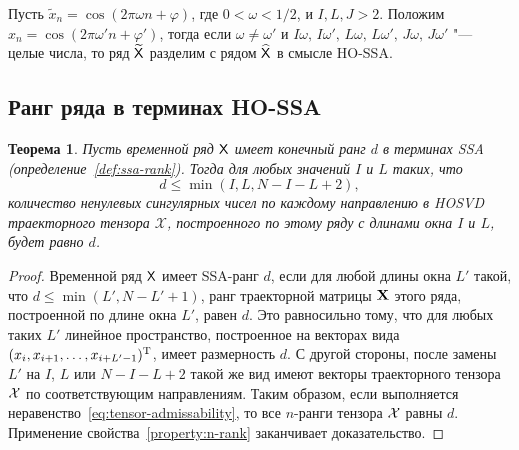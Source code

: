 \documentclass[specialist,
    substylefile=spbu.rtx,
    subf,href,colorlinks=true, 12pt]{disser}
\theoremstyle{plain}
\newtheorem{theorem}{Теорема}
\theoremstyle{definition}
\theoremstyle{remark}
\newtheorem*{remark}{Замечание}
\begin{document}
\begin{itemize}
        Пусть $\tilde{x}_n=\cos(2\pi \omega n + \varphi)$, где $0 < \omega < 1/2$, и $I, L, J > 2$.
        Положим \linebreak $\hat{x}_n=\cos(2\pi \omega' n + \varphi')$,
        тогда если $\omega\ne\omega'$ и $I\omega,\, I\omega',\, L\omega,\, L\omega',\, J\omega,\, J\omega'$
        "--- целые числа, то ряд $\widetilde{\mathsf{X}}$ разделим с рядом $\widehat{\mathsf{X}}$ в смысле HO-SSA.
    \end{itemize}


    \subsection{Ранг ряда в терминах HO-SSA}\label{subsec:tensor-ssa-rank}
    \begin{theorem}
        \label{state:tens-ssa-rank}
        Пусть временной ряд $\mathsf{X}$ имеет конечный ранг $d$ в терминах \emph{SSA} (определение~\ref{def:ssa-rank}).
        Тогда для любых значений $I$ и $L$ таких, что
        \begin{equation}
            d\leqslant\min(I, L, N-I-L+2), \label{eq:tensor-admissability}
        \end{equation}
        количество ненулевых сингулярных чисел по каждому направлению в \emph{HOSVD} траекторного тензора $\mathcal{X}$,
        построенного по этому ряду с длинами окна $I$ и $L$, будет равно $d$.
    \end{theorem}
    \begin{proof}
        Временной ряд $\mathsf{X}$ имеет SSA-ранг $d$, если для любой длины окна $L'$ такой, что
        $d \leqslant \min(L', N-L'+1)$,
        ранг траекторной матрицы $\mathbf{X}$ этого ряда, построенной по длине окна $L'$, равен $d$.
        Это равносильно тому, что для любых таких $L'$ линейное пространство, построенное на векторах вида
        $(x_i, x_{i+1}, \ldots, x_{i + L' - 1})^{\mathrm{T}}$, имеет размерность $d$.
        С другой стороны, после замены $L'$ на $I$, $L$ или $N-I-L+2$ такой же вид имеют векторы траекторного тензора $\mathcal{X}$ по соответствующим направлениям.
        Таким образом, если выполняется неравенство~\eqref{eq:tensor-admissability}, то все $n$-ранги тензора
        $\mathcal{X}$ равны $d$.
        Применение свойства~\ref{property:n-rank} заканчивает доказательство.
    \end{proof}
\end{document}
